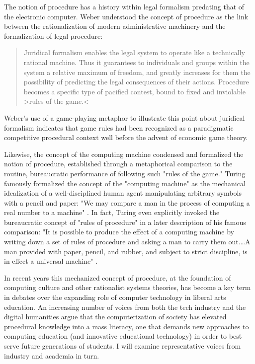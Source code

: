 The notion of procedure has a history within legal formalism predating that of the electronic computer. Weber understood the concept of procedure as the link between the rationalization of modern administrative machinery and the formalization of legal procedure:
\blockquote{
  Juridical formalism enables the legal system to operate like a technically rational machine. Thus it guarantees to individuals and groups within the system a relative maximum of freedom, and greatly increases for them the possibility of predicting the legal consequences of their actions. Procedure becomes a specific type of pacified contest, bound to fixed and inviolable >rules of the game.< \autocite*[811]{Weber1978}
}
Weber's use of a game-playing metaphor to illustrate this point about juridical formalism indicates that game rules had been recognized as a paradigmatic competitive procedural context well before the advent of economic game theory.

Likewise, the concept of the computing machine condensed and formalized the notion of procedure, established through a metaphorical comparison to the routine, bureaucratic performance of following such "rules of the game." Turing famously formalized the concept of the "computing machine" as the mechanical idealization of a well-disciplined human agent manipulating arbitrary symbols with a pencil and paper: "We may compare a man in the process of computing a real number to a machine" \autocite*[231]{Turing1936}. In fact, Turing even explicitly invoked the bureaucratic concept of "rules of procedure" in a later description of his famous comparison: "It is possible to produce the effect of a computing machine by writing down a set of rules of procedure and asking a man to carry them out.…A man provided with paper, pencil, and rubber, and subject to strict discipline, is in effect a universal machine" \autocite*[416]{Turing1948}.

In recent years this mechanized concept of procedure, at the foundation of computing culture and other rationalist systems theories, has become a key term in debates over the expanding role of computer technology in liberal arts education. An increasing number of voices from both the tech industry and the digital humanities argue that the computerization of society has elevated procedural knowledge into a mass literacy, one that demands new approaches to computing education (and innovative educational technology) in order to best serve future generations of students. I will examine representative voices from industry and academia in turn.

